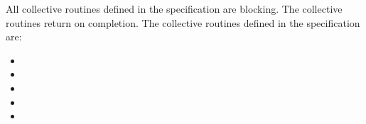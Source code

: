 All collective routines defined in the specification are blocking.  The 
collective routines return on completion.  The collective routines defined in the \openshmem{} specification 
are:

\begin{itemize}
\item[] \broadcast{} 
\item[] \barrier{}
\item[] \barrierall{}
\item[] \collect{}
\item[] \reduction{}
\end{itemize} 
